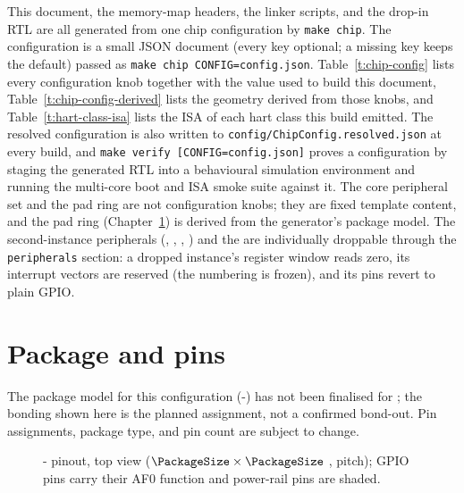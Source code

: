 \documentclass[11pt,pdftex,openany,letterpaper]{report}
\begin{document}
This document, the memory-map headers, the linker scripts, and the drop-in RTL are all generated from one chip configuration by \texttt{make chip}. The configuration is a small JSON document (every key optional; a missing key keeps the \AsicNameForUserGuide{} default) passed as \texttt{make chip CONFIG=config.json}. Table~\ref{t:chip-config} lists every configuration knob together with the value used to build this document, Table~\ref{t:chip-config-derived} lists the geometry derived from those knobs, and Table~\ref{t:hart-class-isa} lists the ISA of each hart class this build emitted. The resolved configuration is also written to \texttt{config/ChipConfig.resolved.json} at every build, and \texttt{make verify [CONFIG=config.json]} proves a configuration by staging the generated RTL into a behavioural simulation environment and running the multi-core boot and ISA smoke suite against it. The core peripheral set and the pad ring are not configuration knobs; they are fixed template content, and the pad ring (Chapter~\ref{s:pinsConfig}) is derived from the generator's package model. The second-instance peripherals (, , , ) and the  are individually droppable through the \texttt{peripherals} section: a dropped instance's register window reads zero, its interrupt vectors are reserved (the numbering is frozen), and its pins revert to plain GPIO.



\clearpage



\chapter{Package and pins} \label{s:pinsConfig}

\ifpackagepreliminary
\begin{Note}
The package model for this configuration ({\PackageTypeName}-{\PackagePinCount}) has not been finalised for \AsicNameForUserGuide{}; the bonding shown here is the planned assignment, not a confirmed bond-out. Pin assignments, package type, and pin count are subject to change.
\end{Note}
\fi

\begin{figure}[htbp]
	\centering
	\resizebox{\ifdim\width>\linewidth \linewidth\else\width\fi}{!}{}
	\caption[{{\PackageTypeName}-{\PackagePinCount} pinout, top view}]{{\PackageTypeName}-{\PackagePinCount} pinout, top view ($\PackageSize \times \PackageSize$ {\PackageUnits}, {\PackagePinPitch} {\PackageUnits} pitch); GPIO pins carry their AF0 function and power-rail pins are shaded.}
	\label{fig:package}
\end{figure}
\end{document}
